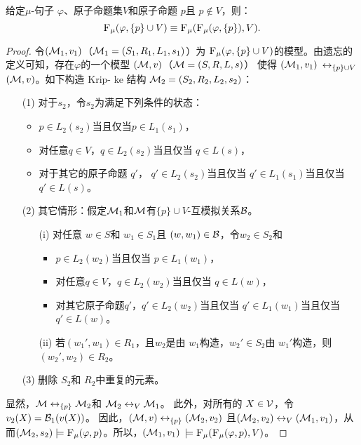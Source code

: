 \begin{proposition}[分解性]\label{chapter06:disTF}  给定$\mu$-句子 $\varphi$、原子命题集$V$和原子命题 $p$且 $p \notin V$，则：
	\[
	{\textsc{F}_{\textsc{$\mu$}}}(\varphi, \{p\} \cup V) \equiv {\textsc{F}_{\textsc{$\mu$}}}({\textsc{F}_{\textsc{$\mu$}}}(\varphi, \{p\}), V).
	\]
\end{proposition}
\begin{proof}
	令$({\cal M}_1,v_1)$（${\cal M}_1=(S_1, R_1, L_1, s_1)$）为 ${\textsc{F}_{\textsc{$\mu$}}}(\varphi, \{p\} \cup V)$的模型。由遗忘的定义可知，存在$\varphi$的一个模型 $({\cal M},v)$（${\cal M} = (S, R,L, s)$） 使得 $({\cal M}_1,v_1)$ $\leftrightarrow_{\{p\} \cup V}$ $({\cal M},v)$。如下构造 Krip- ke 结构 ${\cal M}_2 = (S_2, R_2, L_2, s_2)$：
	\begin{itemize}
		\item[(1)] 对于$s_2$，令$s_2$为满足下列条件的状态：
		\begin{itemize}
			\item $p \in L_2(s_2)$当且仅当$p \in L_1(s_1)$，
			\item 对任意$q \in V$，$q \in L_2(s_2)$当且仅当 $q\in L(s)$，
			\item 对于其它的原子命题 $q'$， $q' \in L_2(s_2)$当且仅当 $q' \in L_1(s_1)$当且仅当 $q'\in L(s)$。
		\end{itemize}
		\item[(2)] 其它情形：假定${\cal M}_1$和${\cal M}$有$\{p\} \cup V$-互模拟关系${\cal B}$。
		\begin{itemize}
			\item[(i)] 对任意 $w \in S$和 $w_1 \in S_1$且 $(w,w_1)\in {\cal B}$，令$w_2 \in S_2$和
			\begin{itemize}
				\item $p \in L_2(w_2)$当且仅当 $p \in L_1(w_1)$，
				\item 对任意$q \in V$，$q \in L_2(w_2)$当且仅当 $q\in L(w)$，
				\item 对其它原子命题$q'$，$q' \in L_2(w_2)$当且仅当 $q' \in L_1(w_1)$当且仅当 $q'\in L(w)$。
			\end{itemize}
			\item[(ii)] 若$(w_1', w_1)\in R_1$，且$w_2$是由 $w_1$构造，$w_2'\in S_2$由 $w_1'$构造，则$(w_2', w_2)\in R_2$。
		\end{itemize}
		\item[(3)] 删除 $S_2$和 $R_2$中重复的元素。
	\end{itemize}
	显然，${\cal M} \leftrightarrow_{\{p\}} {\cal M}_2$和 ${\cal M}_2 \leftrightarrow_V {\cal M}_1$。
	此外，对所有的 $X \in {\cal V}$，令$v_2(X) = {\cal B}_1(v(X))$。
	因此，$({\cal M},v) \leftrightarrow_{\{p\}} ({\cal M}_2,v_2)$ 且$({\cal M}_2,v_2) \leftrightarrow_V ({\cal M}_1,v_1)$，从而$({\cal M}_2, s_2) \models {\textsc{F}_{\textsc{$\mu$}}}(\varphi, p)$。所以，$({\cal M}_1, v_1) $ $\models {\textsc{F}_{\textsc{$\mu$}}}({\textsc{F}_{\textsc{$\mu$}}}(\varphi, p), V)$。
	

\end{proof}
